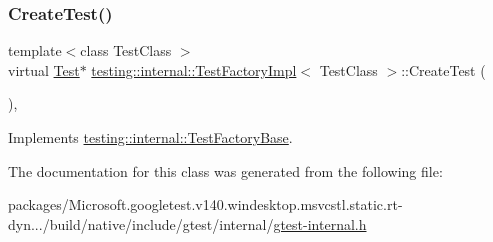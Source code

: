\subsubsection{\texorpdfstring{CreateTest()}{CreateTest()}}
{\footnotesize\ttfamily template$<$class Test\+Class $>$ \\
virtual \mbox{\hyperlink{classtesting_1_1_test}{Test}}$\ast$ \mbox{\hyperlink{classtesting_1_1internal_1_1_test_factory_impl}{testing\+::internal\+::\+Test\+Factory\+Impl}}$<$ Test\+Class $>$\+::Create\+Test (\begin{DoxyParamCaption}{ }\end{DoxyParamCaption})\hspace{0.3cm}{\ttfamily [inline]}, {\ttfamily [virtual]}}



Implements \mbox{\hyperlink{classtesting_1_1internal_1_1_test_factory_base_a07ac3ca0b196cdb092da0bb186b7c030}{testing\+::internal\+::\+Test\+Factory\+Base}}.



The documentation for this class was generated from the following file\+:\begin{DoxyCompactItemize}
\item 
packages/\+Microsoft.\+googletest.\+v140.\+windesktop.\+msvcstl.\+static.\+rt-\/dyn.../build/native/include/gtest/internal/\mbox{\hyperlink{gtest-internal_8h}{gtest-\/internal.\+h}}\end{DoxyCompactItemize}
